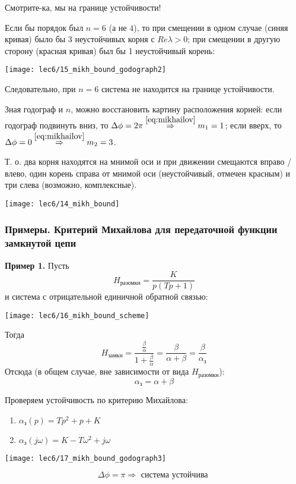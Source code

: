 \documentclass[main.tex]{subfiles}
\begin{document}
Смотрите-ка, мы на границе устойчивости!

Если бы порядок был $ n = 6 $ (а не $4$), то при смещении в одном случае (синяя кривая) было бы 3 неустойчивых корня с $Re \lambda > 0$; при смещении в другую сторону (красная кривая) был бы 1 неустойчивый корень:

\texttt{[image: lec6/15\_mikh\_bound\_godograph2]}

Следовательно, при $ n = 6 $ система не находится на границе устойчивости.

Зная годограф и $n$, можно восстановить картину расположения корней:
если годограф подвинуть вниз, то $ \Delta \phi = 2 \pi \overset{\eqref{eq:mikhailov}}\Rightarrow m_1 = 1  $; если вверх, то $ \Delta \phi = 0 \overset{\eqref{eq:mikhailov}}\Rightarrow m_2 = 3  $.

Т. о. два корня находятся на мнимой оси и при движении смещаются вправо / влево, один корень справа от мнимой оси (неустойчивый, отмечен красным) и три слева (возможно, комплексные).

\texttt{[image: lec6/14\_mikh\_bound]}

\subsubsection{Примеры. Критерий Михайлова для передаточной функции замкнутой цепи}

\textbf{Пример 1.} Пусть
$$ H_{\text{разомкн}} = \frac{K}{p(Tp + 1)} $$
и система с отрицательной единичной обратной связью:

\texttt{[image: lec6/16\_mikh\_bound\_scheme]}

Тогда
$$ H_{\text{замкн}} = \frac{\frac{\beta}{\alpha}}{1 + \frac{\beta}{\alpha}} = \frac{\beta}{\alpha + \beta} = \frac{\beta}{\alpha_{\text{з}}} $$
Отсюда (в общем случае, вне зависимости от вида $ H_{\text{разомкн}} $):
$$ \boxed{ \alpha_{\text{з}} = \alpha + \beta } $$

Проверяем устойчивость по критерию Михайлова:
\begin{enumerate}[noitemsep]
    \item $ \alpha_{\text{з}}(p) = Tp^2 + p + K $
    \item $ \alpha_{\text{з}}(j \omega) = K - T \omega^2 + j \omega $
\end{enumerate}

\texttt{[image: lec6/17\_mikh\_bound\_godograph3]}

$$ \Delta \phi = \pi \Rightarrow \text{ система устойчива } $$
\end{document}
